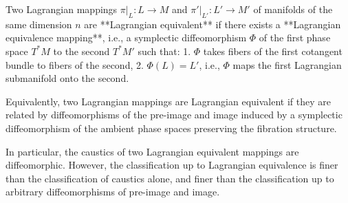 Two Lagrangian mappings $\pi|_L: L \to M$ and $\pi'|_{L'}: L' \to M'$ of manifolds of the same dimension $n$ are **Lagrangian equivalent** if there exists a **Lagrangian equivalence mapping**, i.e., a symplectic diffeomorphism $\Phi$ of the first phase space $T^*M$ to the second $T^*M'$ such that:
1. $\Phi$ takes fibers of the first cotangent bundle to fibers of the second,
2. $\Phi(L) = L'$, i.e., $\Phi$ maps the first Lagrangian submanifold onto the second.

Equivalently, two Lagrangian mappings are Lagrangian equivalent if they are related by diffeomorphisms of the pre-image and image induced by a symplectic diffeomorphism of the ambient phase spaces preserving the fibration structure.

In particular, the caustics of two Lagrangian equivalent mappings are diffeomorphic. However, the classification up to Lagrangian equivalence is finer than the classification of caustics alone, and finer than the classification up to arbitrary diffeomorphisms of pre-image and image.
